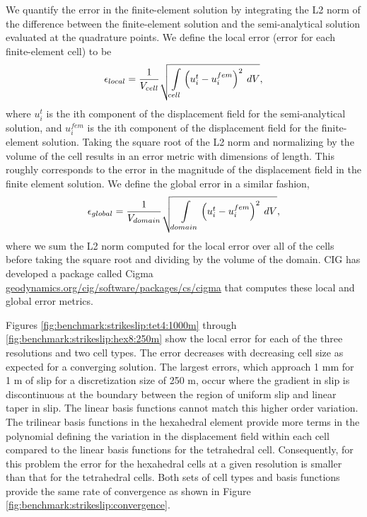 We quantify the error in the finite-element solution by integrating
the L2 norm of the difference between the finite-element solution
 and the semi-analytical solution evaluated at the quadrature points.
We define the local error (error for each finite-element cell) to
be
\begin{equation}
\epsilon_{local}=\frac{1}{V_{cell}}\sqrt{\intop_{cell}\left(u_{i}^{t}-u_{i}^{fem}\right)^{2}\: dV},
\end{equation}
where $u_{i}^{t}$ is the ith component of the displacement field
for the semi-analytical  solution, and $u_{i}^{fem}$ is the ith component
of the displacement field for the finite-element  solution.  Taking
the square root of the L2 norm and normalizing by  the volume of the
cell results in an error metric with dimensions of length.  This roughly
corresponds to the error in the magnitude of the displacement field
in the finite element solution. We define the global error in a similar
fashion,
\begin{equation}
\epsilon_{global}=\frac{1}{V_{domain}}\sqrt{\intop_{domain}\left(u_{i}^{t}-u_{i}^{fem}\right)^{2}\: dV},
\end{equation}
 where we sum the L2 norm computed for the local error over all of
the  cells before taking the square root and dividing by the volume
of the domain. CIG has developed a package called Cigma \url{geodynamics.org/cig/software/packages/cs/cigma}
that computes these local and global error metrics.

Figures \ref{fig:benchmark:strikeslip:tet4:1000m} through \ref{fig:benchmark:strikeslip:hex8:250m}
show the local error for each of the three resolutions and two cell
types. The error decreases with decreasing cell size as expected for
a converging solution. The largest errors, which approach 1 mm for
1 m of slip for a discretization size of 250 m, occur where the gradient
in slip is discontinuous at the boundary between the region of uniform
slip and linear taper in slip. The linear basis functions cannot match
this higher order variation. The trilinear basis functions in the
hexahedral element provide more terms in the polynomial defining the
variation in the displacement field within each cell compared to the
linear basis functions for the tetrahedral cell. Consequently, for
this problem the error for the hexahedral cells at a given resolution
is smaller than that for the tetrahedral cells. Both sets of cell
types and basis functions provide the same rate of convergence as
shown in Figure \vref{fig:benchmark:strikeslip:convergence}.


